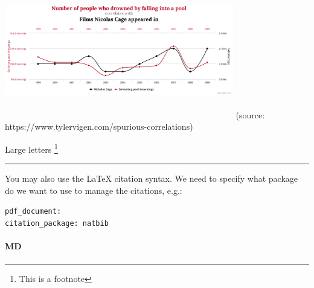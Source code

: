 \documentclass[
  11pt,
]{article}
\begin{document}
\begin{center} %
  \includegraphics[width=10cm, height=6cm, keepaspectratio]{img/chart.png}  
(source: https://www.tylervigen.com/spurious-correlations)
\end{center}
\newpage

\Large Large letters \footnote{This is a footnote}

\begin{center}\rule{0.5\linewidth}{0.5pt}\end{center}

You may also use the LaTeX citation syntax. We need to specify what
package do we want to use to manage the citations, e.g.:

\texttt{pdf\_document:}~\\
\texttt{citation\_package:\ natbib}

\hypertarget{md}{%
\paragraph{MD}\label{md}}
\end{document}
